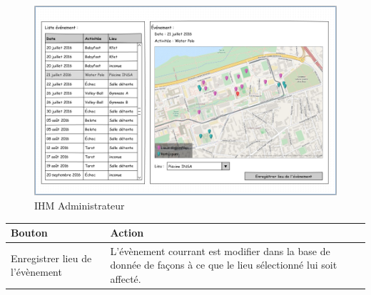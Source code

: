 \documentclass[a4paper,11pt]{article}
\begin{document}
\begin{figure}[H]
  \begin{center}
    \includegraphics[width=15cm]{../../IHM/IHM_responsable.png}
    \caption{IHM Administrateur}
  \end{center}
\end{figure}

\begin{table}[H]
  \begin{center}
    \begin{tabular}{|m{4cm}|m{10cm}|}
       \hline
       \textbf{Bouton} & \textbf{Action} \\
       \hline
       Enregistrer lieu de l'évènement & L'évènement courrant est modifier dans la base de donnée de façons à ce que le lieu sélectionné lui soit affecté.   \\
       \hline
    \end{tabular}
  \end{center}
\end{table}
\end{document}

